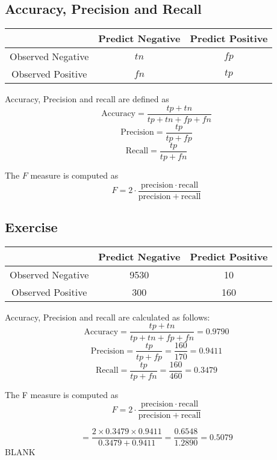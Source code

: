 \documentclass[a4paper,12pt]{article}
\begin{document}
\subsection*{Accuracy, Precision and Recall}

\begin{center}
\begin{tabular}{|c|c|c|}
\hline  & \phantom{spa}Predict Negative\phantom{spa} & \phantom{spa}Predict Positive\phantom{spa} \\ 
\hline\phantom{spa} Observed Negative \phantom{spa}& $tn$	&	$fp$	\\ 
\hline \phantom{spa}Observed Positive\phantom{spa} &  $fn$	&	$tp$	\\ 
\hline 
\end{tabular} 
\end{center}


\noindent Accuracy, Precision and recall are defined as
\[\mbox{Accuracy}=\frac{tp+tn}{tp+tn+fp+fn} \]
\[\mbox{Precision}=\frac{tp}{tp+fp} \] 
\[\mbox{Recall}=\frac{tp}{tp+fn} \]

\noindent The $F$ measure is computed as
\[F = 2 \cdot \frac{\mathrm{precision} \cdot \mathrm{recall}}{ \mathrm{precision} + \mathrm{recall}}\]
\medskip
\subsection*{Exercise}
\begin{center}
\begin{tabular}{|c|c|c|}
\hline  & \phantom{spa}Predict Negative\phantom{spa} & \phantom{spa}Predict Positive\phantom{spa} \\ 
\hline\phantom{spa} Observed Negative \phantom{spa}&	9530	&	10	\\ 
\hline \phantom{spa}Observed Positive\phantom{spa} & 	300	&	160	\\ 
\hline 
\end{tabular} 
\end{center}
Accuracy, Precision and recall are calculated as follows:
\[\mbox{Accuracy}=\frac{tp+tn}{tp+tn+fp+fn} = 0.9790 \]
\[\mbox{Precision}=\frac{tp}{tp+fp} = \frac{160}{170} = 0.9411\] 
\[\mbox{Recall}=\frac{tp}{tp+fn} =\frac{160}{460} = 0.3479 \]

\noindent The F measure is computed as
\[F = 2 \cdot \frac{\mathrm{precision} \cdot \mathrm{recall}}{ \mathrm{precision} + \mathrm{recall}}\]

\[ = \frac{2 \times 0.3479 \times 0.9411}{0.3479 + 0.9411} = \frac{0.6548}{1.2890} = \boldsymbol{0.5079} \]
\newpage
BLANK
\end{document}

